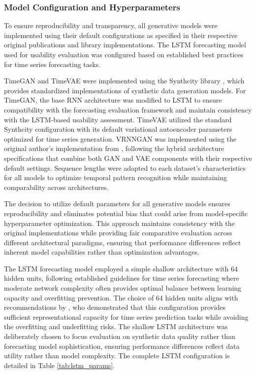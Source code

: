 \documentclass{article}
\begin{document}
\subsubsection{Model Configuration and Hyperparameters}

To ensure reproducibility and transparency, all generative models were implemented using their default configurations as specified in their respective original publications and library implementations. The LSTM forecasting model used for usability evaluation was configured based on established best practices for time series forecasting tasks.

TimeGAN and TimeVAE were implemented using the Synthcity library \parencite{Qian2023-pa}, which provides standardized implementations of synthetic data generation models. For TimeGAN, the base RNN architecture was modified to LSTM to ensure compatibility with the forecasting evaluation framework and maintain consistency with the LSTM-based usability assessment. TimeVAE utilized the standard Synthcity configuration with its default variational autoencoder parameters optimized for time series generation. VRNNGAN was implemented using the original author's implementation from \textcite{lee_vrnngan_2022}, following the hybrid architecture specifications that combine both GAN and VAE components with their respective default settings. Sequence lengths were adapted to each dataset's characteristics for all models to optimize temporal pattern recognition while maintaining comparability across architectures.

The decision to utilize default parameters for all generative models ensures reproducibility and eliminates potential bias that could arise from model-specific hyperparameter optimization. This approach maintains consistency with the original implementations while providing fair comparative evaluation across different architectural paradigms, ensuring that performance differences reflect inherent model capabilities rather than optimization advantages.

The LSTM forecasting model employed a simple shallow architecture with 64 hidden units, following established guidelines for time series forecasting where moderate network complexity often provides optimal balance between learning capacity and overfitting prevention. The choice of 64 hidden units aligns with recommendations by \textcite{Prihatno2021-mi}, who demonstrated that this configuration provides sufficient representational capacity for time series prediction tasks while avoiding the overfitting and underfitting risks. The shallow LSTM architecture was deliberately chosen to focus evaluation on synthetic data quality rather than forecasting model sophistication, ensuring performance differences reflect data utility rather than model complexity. The complete LSTM configuration is detailed in Table \ref{tab:lstm_params}.
\end{document}
